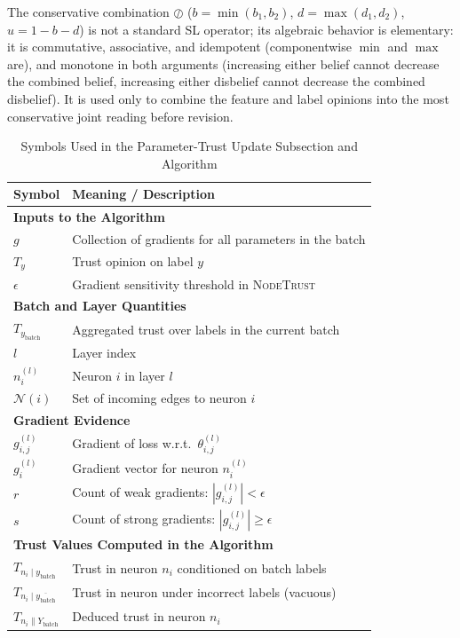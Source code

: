 The conservative combination $\oslash$ ($b = \min(b_1, b_2)$, $d = \max(d_1, d_2)$, $u = 1 - b - d$) is not a standard SL operator; its algebraic behavior is elementary: it is commutative, associative, and idempotent (componentwise $\min$ and $\max$ are), and monotone in both arguments (increasing either belief cannot decrease the combined belief, increasing either disbelief cannot decrease the combined disbelief). It is used only to combine the feature and label opinions into the most conservative joint reading before revision.
\begin{table}[H]
\centering
\caption{Symbols Used in the Parameter-Trust Update Subsection and Algorithm}
\label{tab:params-algorithm-append}
\renewcommand{\arraystretch}{1.2}
\begin{tabular}{ll}
\hline
\textbf{Symbol} & \textbf{Meaning / Description} \\
\hline
\multicolumn{2}{l}{\textbf{Inputs to the Algorithm}} \\
$g$ & Collection of gradients for all parameters in the batch \\
$T_y$ & Trust opinion on label $y$ \\
$\epsilon$ & Gradient sensitivity threshold in \textsc{NodeTrust} \\[4pt]

\multicolumn{2}{l}{\textbf{Batch and Layer Quantities}} \\
$T_{y_{\text{batch}}}$ & Aggregated trust over labels in the current batch \\
$l$ & Layer index \\
$n_i^{(l)}$ & Neuron $i$ in layer $l$ \\
$\mathcal{N}(i)$ & Set of incoming edges to neuron $i$ \\[4pt]

\multicolumn{2}{l}{\textbf{Gradient Evidence}} \\
$g^{(l)}_{i,j}$ & Gradient of loss w.r.t.\ $\theta^{(l)}_{i,j}$ \\
$g^{(l)}_{i}$ & Gradient vector for neuron $n_i^{(l)}$ \\
$r$ & Count of weak gradients: $|g^{(l)}_{i,j}| < \epsilon$ \\
$s$ & Count of strong gradients: $|g^{(l)}_{i,j}| \ge \epsilon$ \\[4pt]

\multicolumn{2}{l}{\textbf{Trust Values Computed in the Algorithm}} \\
$T_{n_i \mid y_{\text{batch}}}$ & Trust in neuron $n_i$ conditioned on batch labels \\
$T_{n_i \mid \overline{y_{\text{batch}}}}$ & Trust in neuron under incorrect labels (vacuous) \\
$T_{n_i \parallel Y_{\text{batch}}}$ & Deduced trust in neuron $n_i$ \\[4pt]


\end{tabular}
\end{table}
